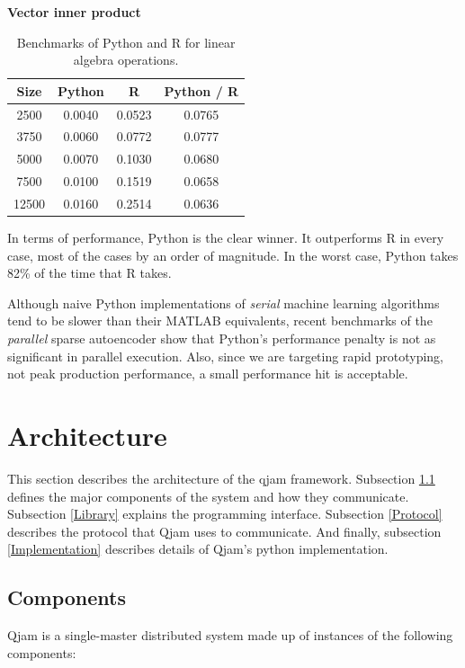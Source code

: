 \documentclass[%
  final,
  notitlepage,
  narroweqnarray,
  inline,
]{ieee}
\begin{document}
\begin{table}[h!]
\begin{center}
    \vspace{1em}
    \textbf{Vector inner product} \\
    \begin{tabular}{cccc}
      Size  & Python &  R       & Python / R \\
      \hline
      2500  & 0.0040 & 0.0523 & 0.0765 \\
      3750  & 0.0060 & 0.0772 & 0.0777 \\
      5000  & 0.0070 & 0.1030 & 0.0680 \\
      7500  & 0.0100 & 0.1519 & 0.0658 \\
      12500 & 0.0160 & 0.2514 & 0.0636 \\
    \end{tabular}
  \end{center}
  \caption{Benchmarks of Python and R for linear algebra
    operations.}
  \label{PythonvsR}
\end{table}

In terms of performance, Python is the clear winner. It outperforms R in every
case, most of the cases by an order of magnitude. In the worst case, Python
takes 82\% of the time that R takes.

Although naive Python implementations of {\it serial} machine learning algorithms
tend to be slower than their MATLAB equivalents, recent benchmarks of the {\it
  parallel} sparse autoencoder show that Python's performance penalty is not as
significant in parallel execution. Also, since we are targeting rapid
prototyping, not peak production performance, a small performance hit is
acceptable.

\section{Architecture}

This section describes the architecture of the qjam framework. Subsection
\ref{Components} defines the major components of the system and how they
communicate. Subsection \ref{Library} explains the programming interface.
Subsection \ref{Protocol} describes the protocol that Qjam uses to communicate.
And finally, subsection \ref{Implementation} describes details of Qjam's 
python implementation.


\subsection{Components}
\label{Components}

Qjam is a single-master distributed system made up of instances of the
following components: \\
\end{document}
